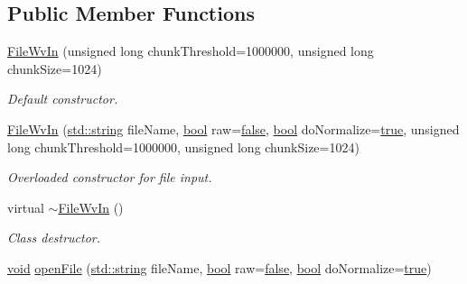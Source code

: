 \subsection*{Public Member Functions}
\begin{DoxyCompactItemize}
\item 
\hyperlink{class_nyq_1_1_file_wv_in_ad5a2290033fd2a367aada83cd78a152d}{File\+Wv\+In} (unsigned long chunk\+Threshold=1000000, unsigned long chunk\+Size=1024)
\begin{DoxyCompactList}\small\item\em Default constructor. \end{DoxyCompactList}\item 
\hyperlink{class_nyq_1_1_file_wv_in_af52be61388e804e8d0a6848ed9391242}{File\+Wv\+In} (\hyperlink{test__lib_f_l_a_c_2format_8c_ab02026ad0de9fb6c1b4233deb0a00c75}{std\+::string} file\+Name, \hyperlink{mac_2config_2i386_2lib-src_2libsoxr_2soxr-config_8h_abb452686968e48b67397da5f97445f5b}{bool} raw=\hyperlink{mac_2config_2i386_2lib-src_2libsoxr_2soxr-config_8h_a65e9886d74aaee76545e83dd09011727}{false}, \hyperlink{mac_2config_2i386_2lib-src_2libsoxr_2soxr-config_8h_abb452686968e48b67397da5f97445f5b}{bool} do\+Normalize=\hyperlink{mac_2config_2i386_2lib-src_2libsoxr_2soxr-config_8h_a41f9c5fb8b08eb5dc3edce4dcb37fee7}{true}, unsigned long chunk\+Threshold=1000000, unsigned long chunk\+Size=1024)
\begin{DoxyCompactList}\small\item\em Overloaded constructor for file input. \end{DoxyCompactList}\item 
virtual \hyperlink{class_nyq_1_1_file_wv_in_a7d312c11627a81329375035105701f4c}{$\sim$\+File\+Wv\+In} ()
\begin{DoxyCompactList}\small\item\em Class destructor. \end{DoxyCompactList}\item 
\hyperlink{sound_8c_ae35f5844602719cf66324f4de2a658b3}{void} \hyperlink{class_nyq_1_1_file_wv_in_a5c1cff2bb29b3956e8d55460080a554d}{open\+File} (\hyperlink{test__lib_f_l_a_c_2format_8c_ab02026ad0de9fb6c1b4233deb0a00c75}{std\+::string} file\+Name, \hyperlink{mac_2config_2i386_2lib-src_2libsoxr_2soxr-config_8h_abb452686968e48b67397da5f97445f5b}{bool} raw=\hyperlink{mac_2config_2i386_2lib-src_2libsoxr_2soxr-config_8h_a65e9886d74aaee76545e83dd09011727}{false}, \hyperlink{mac_2config_2i386_2lib-src_2libsoxr_2soxr-config_8h_abb452686968e48b67397da5f97445f5b}{bool} do\+Normalize=\hyperlink{mac_2config_2i386_2lib-src_2libsoxr_2soxr-config_8h_a41f9c5fb8b08eb5dc3edce4dcb37fee7}{true})

\end{DoxyCompactItemize}
